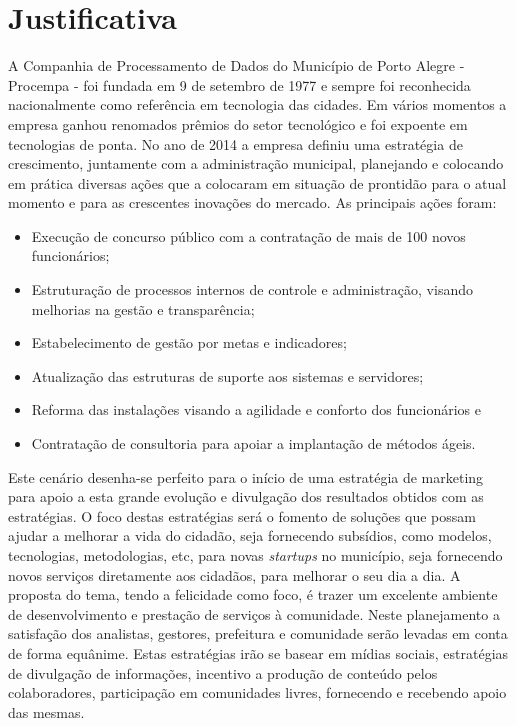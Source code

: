 \chapter{Justificativa}

A Companhia de Processamento de Dados do Município de Porto Alegre  - Procempa - foi fundada em 9 de setembro de 1977 e sempre foi reconhecida nacionalmente como referência em tecnologia das cidades. Em vários momentos a empresa ganhou renomados prêmios do setor tecnológico e foi expoente em tecnologias de ponta.
No ano de 2014 a empresa definiu uma estratégia de crescimento, juntamente com a administração municipal, planejando e colocando em prática diversas ações que a colocaram em situação de prontidão para o atual momento e para as crescentes inovações do mercado. As principais ações foram:

\begin{itemize}
\item Execução de concurso público com a contratação de mais de 100 novos funcionários;
\item Estruturação de processos internos de controle e administração, visando melhorias na gestão e transparência;
\item Estabelecimento de gestão por metas e indicadores;
\item Atualização das estruturas de suporte aos sistemas e servidores;
\item Reforma das instalações visando a agilidade e conforto dos funcionários e
\item Contratação de consultoria para apoiar a implantação de métodos ágeis.
\end{itemize}
Este cenário desenha-se perfeito para o início de uma estratégia de marketing para apoio a esta grande evolução e divulgação dos resultados obtidos com as estratégias. O foco destas estratégias será o fomento de soluções que possam ajudar a melhorar a vida do cidadão, seja fornecendo subsídios, como modelos, tecnologias, metodologias, etc, para novas \textit{startups} no município, seja fornecendo novos serviços diretamente aos cidadãos, para melhorar o seu dia a dia.
A proposta do tema, tendo a felicidade como foco, é trazer um excelente ambiente de desenvolvimento e prestação de serviços à comunidade. Neste planejamento a satisfação dos analistas, gestores, prefeitura e comunidade serão levadas em conta de forma equânime.
Estas estratégias irão se basear em mídias sociais, estratégias de divulgação de informações, incentivo a produção de conteúdo pelos colaboradores, participação em comunidades livres, fornecendo e recebendo apoio das mesmas.

